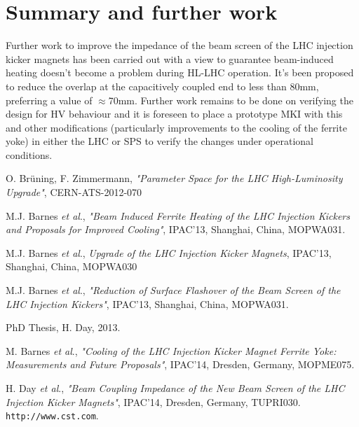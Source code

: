 \documentclass[a4paper,
              ]{jacow}
\begin{document}
\section{Summary and further work}

Further work to improve the impedance of the beam screen of the LHC injection kicker magnets has been carried out with a view to guarantee beam-induced heating doesn't become a problem during HL-LHC operation. It's been proposed to reduce the overlap at the capacitively coupled end to less than 80mm, preferring a value of $\approx$70mm. Further work remains to be done on verifying the design for HV behaviour and it is foreseen to place a prototype MKI with this and other modifications (particularly improvements to the cooling of the ferrite yoke) in either the LHC or SPS to verify the changes under operational conditions.


\begin{thebibliography}{9}

O. Brüning, F. Zimmermann, \emph{"Parameter Space for the LHC High-Luminosity Upgrade"}, CERN-ATS-2012-070 

M.J. Barnes \emph{et al}., \emph{"Beam Induced Ferrite Heating of the LHC Injection Kickers and Proposals for Improved Cooling"}, IPAC'13, Shanghai, China, MOPWA031.

M.J. Barnes \emph{et al}., \emph{Upgrade of the LHC Injection Kicker Magnets}, IPAC'13, Shanghai, China, MOPWA030

M.J. Barnes \emph{et al}., \emph{"Reduction of Surface Flashover of the Beam Screen of the LHC Injection Kickers"}, IPAC'13, Shanghai, China, MOPWA031.

PhD Thesis, H. Day, 2013.

M. Barnes \emph{et al}., \emph{"Cooling of the LHC Injection Kicker Magnet Ferrite Yoke: Measurements and Future Proposals"}, IPAC'14, Dresden, Germany, MOPME075.

H. Day \emph{et al}., \emph{"Beam Coupling Impedance of the New Beam Screen of the LHC Injection Kicker Magnets"}, IPAC'14, Dresden, Germany, TUPRI030.
\texttt{http://www.cst.com}.

\end{thebibliography}
\end{document}
